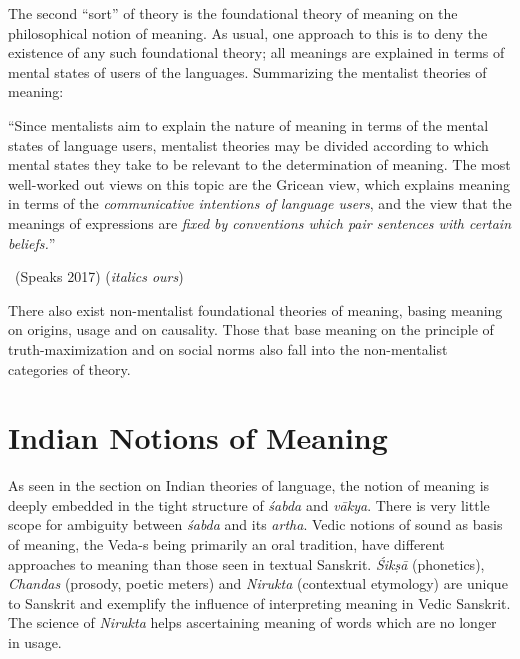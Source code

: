 The second “sort” of theory is the foundational theory of meaning on the philosophical notion of meaning. As usual, one approach to this is to deny the existence of any such foundational theory; all meanings are explained in terms of mental states of users of the languages. Summarizing the mentalist theories of meaning:

\begin{myquote}
“Since mentalists aim to explain the nature of meaning in terms of the mental states of language users, mentalist theories may be divided according to which mental states they take to be relevant to the determination of meaning. The most well-worked out views on this topic are the Gricean view, which explains meaning in terms of the \textit{communicative intentions of language users}, and the view that the meanings of expressions are \textit{fixed by conventions which pair sentences with certain beliefs.}”

~\hfill (Speaks 2017) (\textit{italics ours})
\end{myquote}

There also exist non-mentalist foundational theories of meaning, basing meaning on origins, usage and on causality. Those that base meaning on the principle of truth-maximization and on social norms also fall into the non-mentalist categories of theory.


\section*{Indian Notions of Meaning}

\vskip -5pt

As seen in the section on Indian theories of language, the notion of meaning is deeply embedded in the tight structure of \textit{śabda} and \textit{vākya}. There is very little scope for ambiguity between \textit{śabda} and its \textit{artha}. Vedic notions of sound as basis of meaning, the Veda-s being primarily an oral tradition, have different approaches to meaning than those seen in textual Sanskrit. \textit{Śikṣā} (phonetics), \textit{Chandas} (prosody, poetic meters) and \textit{Nirukta} (contextual etymology) are unique to Sanskrit and exemplify the influence of interpreting meaning in Vedic Sanskrit. The science of \textit{Nirukta} helps ascertaining meaning of words which are no longer in usage.

